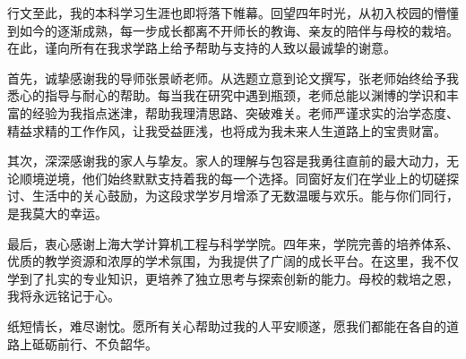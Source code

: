 \begin{acknowledgement}

行文至此，我的本科学习生涯也即将落下帷幕。回望四年时光，从初入校园的懵懂到如今的逐渐成熟，每一步成长都离不开师长的教诲、亲友的陪伴与母校的栽培。在此，谨向所有在我求学路上给予帮助与支持的人致以最诚挚的谢意。

首先，诚挚感谢我的导师张景峤老师。从选题立意到论文撰写，张老师始终给予我悉心的指导与耐心的帮助。每当我在研究中遇到瓶颈，老师总能以渊博的学识和丰富的经验为我指点迷津，帮助我理清思路、突破难关。老师严谨求实的治学态度、精益求精的工作作风，让我受益匪浅，也将成为我未来人生道路上的宝贵财富。

其次，深深感谢我的家人与挚友。家人的理解与包容是我勇往直前的最大动力，无论顺境逆境，他们始终默默支持着我的每一个选择。同窗好友们在学业上的切磋探讨、生活中的关心鼓励，为这段求学岁月增添了无数温暖与欢乐。能与你们同行，是我莫大的幸运。

最后，衷心感谢上海大学计算机工程与科学学院。四年来，学院完善的培养体系、优质的教学资源和浓厚的学术氛围，为我提供了广阔的成长平台。在这里，我不仅学到了扎实的专业知识，更培养了独立思考与探索创新的能力。母校的栽培之恩，我将永远铭记于心。

纸短情长，难尽谢忱。愿所有关心帮助过我的人平安顺遂，愿我们都能在各自的道路上砥砺前行、不负韶华。


\end{acknowledgement}
